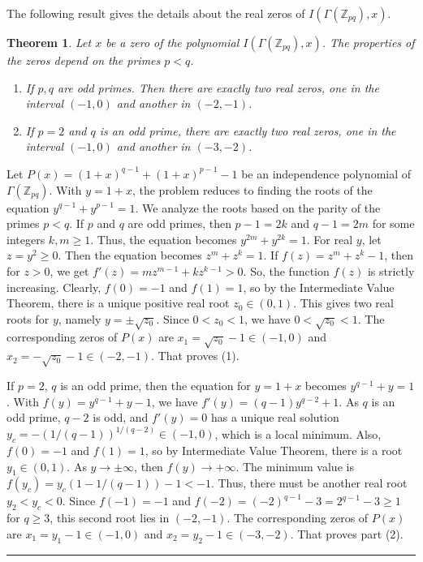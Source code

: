\documentclass[12pt,twoside]{article}
\newtheorem{theorem}{Theorem}[section]
\renewenvironment{proof}{{\noindent\bfseries Proof.}}{\qed}
\def\qed{\nolinebreak\hfill\rule{.2cm}{.2cm}\par\addvspace{.5cm}}
\begin{document}
The following result gives the details about the real zeros of $I(\varGamma(\mathbb{Z}_{pq}), x).$
\begin{theorem}\rm\label{zeros pq}
	Let $x$ be a zero of the polynomial $I(\varGamma(\mathbb{Z}_{pq}), x)$. The properties of the zeros depend on the primes $p < q$.
	\begin{enumerate}
		\item If $p, q$ are odd primes. Then there are exactly two real zeros, one in the interval $(-1, 0)$ and another in $(-2, -1)$.
		\item If $p=2$ and $q$ is an odd prime, there are exactly two real zeros, one in the interval $(-1, 0)$ and another in $(-3, -2)$.
	\end{enumerate}
\end{theorem}
\begin{proof}
	Let $P(x) = (1+x)^{q-1} + (1+x)^{p-1} - 1$ be an independence polynomial of $\varGamma(\mathbb{Z}_{pq})$.  With $y=1+x$, the problem reduces to finding the roots of the equation $y^{q-1} + y^{p-1} = 1$. We analyze the roots based on the parity of the primes $p<q$. If $p $ and $q$ are odd primes, then $p-1=2k$ and $q-1=2m$ for some integers $k,m \ge 1$. Thus, the equation becomes $y^{2m} + y^{2k} = 1$. For real $y$, let $z=y^2 \ge 0$. Then the equation becomes $z^m + z^k = 1$. If $f(z) = z^m + z^k - 1$, then for $z>0$, we get $f'(z) = mz^{m-1} + kz^{k-1} > 0$. So, the function $f(z)$ is strictly increasing. Clearly, $f(0)=-1$ and $f(1)=1$, so by the Intermediate Value Theorem, there is a unique positive real root $z_0 \in (0,1)$. This gives two real roots for $y$, namely $y = \pm\sqrt{z_0}$. Since $0 < z_0 < 1$, we have $0 < \sqrt{z_0} < 1$. The corresponding zeros of $P(x)$ are $x_1 = \sqrt{z_0}-1 \in (-1,0)$ and $x_2 = -\sqrt{z_0}-1 \in (-2,-1)$. That proves (1). 
	
	If $p=2$, $q$ is an odd prime, then the equation for $y=1+x$ becomes $y^{q-1} + y = 1$.
	With $f(y) = y^{q-1}+y-1$, we have $f'(y) = (q-1)y^{q-2}+1$. As $q$ is an odd prime, $q-2$ is odd, and  $f'(y)=0$ has a unique real solution $y_c = -(1/(q-1))^{1/(q-2)} \in (-1,0)$, which is a local minimum. Also,
	$f(0)=-1$ and $f(1)=1$, so by Intermediate Value Theorem, there is a root $y_1 \in (0,1)$.
	As $y \to \pm\infty$, then $f(y) \to +\infty$. The minimum value is $f(y_c) = y_c(1 - 1/(q-1)) - 1 < -1$. Thus, there must be another real root $y_2 < y_c < 0$. Since $f(-1)=-1$ and $f(-2) = (-2)^{q-1}-3 = 2^{q-1}-3 \ge 1$ for $q \ge 3$, this second root lies in $(-2, -1)$.
	The corresponding zeros of $P(x)$ are $x_1=y_1-1 \in (-1,0)$ and $x_2=y_2-1 \in (-3,-2)$. That proves part (2). 
\end{proof}
\end{document}
